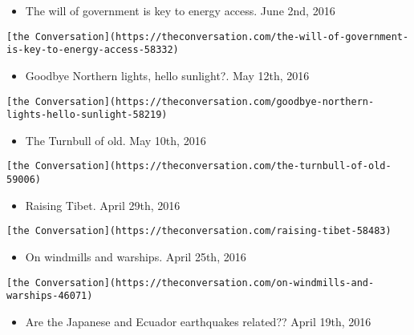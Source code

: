\documentclass[
]{article}
\providecommand{\tightlist}{%
  \setlength{\itemsep}{0pt}\setlength{\parskip}{0pt}}
\begin{document}
\begin{itemize}
\tightlist
\item
  The will of government is key to energy access. June 2nd, 2016
\end{itemize}

\begin{verbatim}
[the Conversation](https://theconversation.com/the-will-of-government-is-key-to-energy-access-58332)
\end{verbatim}

\begin{itemize}
\tightlist
\item
  Goodbye Northern lights, hello sunlight?. May 12th, 2016
\end{itemize}

\begin{verbatim}
[the Conversation](https://theconversation.com/goodbye-northern-lights-hello-sunlight-58219)
\end{verbatim}

\begin{itemize}
\tightlist
\item
  The Turnbull of old. May 10th, 2016
\end{itemize}

\begin{verbatim}
[the Conversation](https://theconversation.com/the-turnbull-of-old-59006)
\end{verbatim}

\begin{itemize}
\tightlist
\item
  Raising Tibet. April 29th, 2016
\end{itemize}

\begin{verbatim}
[the Conversation](https://theconversation.com/raising-tibet-58483)
\end{verbatim}

\begin{itemize}
\tightlist
\item
  On windmills and warships. April 25th, 2016
\end{itemize}

\begin{verbatim}
[the Conversation](https://theconversation.com/on-windmills-and-warships-46071)
\end{verbatim}

\begin{itemize}
\tightlist
\item
  Are the Japanese and Ecuador earthquakes related?? April 19th, 2016
\end{itemize}
\end{document}

